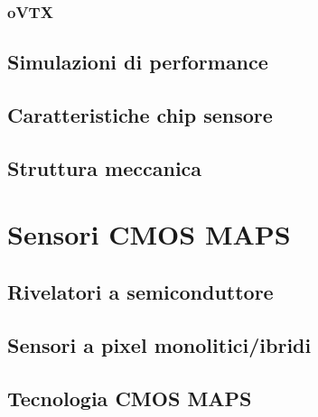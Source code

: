 \documentclass[10pt,a4paper,twoside]{report}
\begin{document}
\subsection{oVTX}


\section{Simulazioni di performance}


\section{Caratteristiche chip sensore}



\section{Struttura meccanica}



\chapter{Sensori CMOS MAPS}


\section{Rivelatori a semiconduttore}

\section{Sensori a pixel monolitici/ibridi}

\section{Tecnologia CMOS MAPS}
\end{document}
